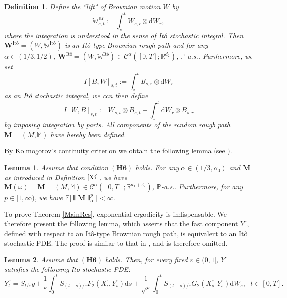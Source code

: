 \documentclass[10pt,a4paper]{article}
\newtheorem{lemma}{Lemma}[section]
\newtheorem{definition}{Definition}[section]
\numberwithin{equation}{section}
\begin{document}
\begin{definition}\label{Xi}
Define the ``lift" of Brownian motion $W$ by
$$\mathbb W_{s,t}^{\text{It\^{o}}}:= \int_s^t  W_{s,r} \otimes \mathrm{d} W_r,$$
where the integration is understood in the sense of It\^{o} stochastic integral.
Then $\mathbf W^{\text{It\^{o}} }=(W,\mathbb W^{\text{It\^{o}}})$ is an It\^{o}-type Brownian rough path
and for any $\alpha \in (1/3, 1/2)$, $\mathbf W^{\text{It\^{o}} }=(W,\mathbb W^{\text{It\^{o}}}) \in \mathscr{C}^\alpha ([0,T]; \mathbb R^{d_2})$, $\mathbb P$-a.s..
Furthermore, we set
$$I[B,W]_{s,t}:=\int_s^t  B_{s,r} \otimes \mathrm{d} W_r$$
as an It\^{o} stochastic integral, we can then define
$$I[W,B]_{s,t}:= W_{s,t} \otimes  B_{s,t} -\int_s^t \mathrm{d} W_r \otimes  B_{s,r} $$
by imposing integration by parts.
All components of the random rough path $\mathbf M=(M, \mathbb M)$ have hereby been defined.
\end{definition}





By Kolmogorov's continuity criterion we obtain the following lemma (see \cite[Lemma 4.6]{In22}).

\begin{lemma} \label{mixrandom}
Assume that condition $(\mathbf{H6})$ holds. For any $\alpha \in (1/3, \alpha_0)$ and $\mathbf M$ as introduced in Definition $\ref{Xi}$, we have $\mathbf M(\omega)=\mathbf M=(M, \mathbb M) \in \mathscr{C}^\alpha ([0,T]; \mathbb R^{d_1+d_2})$, $\mathbb P$-a.s..
Furthermore, for any $p \in [1,\infty)$, we have $\mathbb E \big[\interleave \mathbf M \interleave_\alpha^p \big] <\infty$.
\end{lemma}






To prove Theorem \ref{MainRes}, exponential ergodicity is indispensable.
We therefore present the following lemma,
which asserts that the fast component $Y^\varepsilon$, defined with respect to an It\^{o}-type Brownian rough path, is equivalent to an It\^{o} stochastic PDE.
The proof is similar to that in \cite[Lemma 3.3]{LLPX25}, and is therefore omitted.
\begin{lemma}\label{RSPDE}
	Assume that $(\mathbf{H6})$ holds. Then, for every fixed $\varepsilon \in (0,1]$, $Y^\varepsilon$ satisfies the following It\^{o} stochastic PDE:
	\begin{equation}\label{eqY}
		Y_t^\varepsilon= S_{t/\varepsilon} y+ \frac 1\varepsilon \int_0^{t} S_{(t-s)/\varepsilon} F_2(X_s^\varepsilon, Y_s^\varepsilon) \mathrm{d} s
		+\frac 1{\sqrt{\varepsilon}} \int_0^{t} S_{(t-s)/\varepsilon} G_2(X_s^\varepsilon, Y_s^\varepsilon) \mathrm{d} W_s, ~~~t \in [0,T].
	\end{equation}
\end{lemma}
\end{document}
